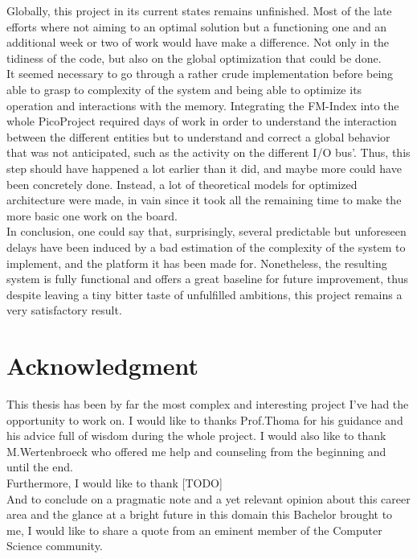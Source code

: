 Globally, this project in its current states remains unfinished. Most of the late efforts where not aiming to an optimal solution but a functioning one and an additional week or two of work would have make a difference. Not only in the tidiness of the code, but also on the global optimization that could be done. \\

It seemed necessary to go through a rather crude implementation before being able to grasp to complexity of the system and being able to optimize its operation and interactions with the memory. Integrating the FM-Index into the whole PicoProject required days of work in order to understand the interaction between the different entities but to understand and correct a global behavior that was not anticipated, such as the activity on the different I/O bus'. Thus, this step should have happened a lot earlier than it did, and maybe more could have been concretely done. Instead, a lot of theoretical models for optimized architecture were made, in vain since it took all the remaining time to make the more basic one work on the board. \\

In conclusion, one could say that, surprisingly, several predictable but unforeseen delays have been induced by a bad estimation of the complexity of the system to implement, and the platform it has been made for. Nonetheless, the resulting system is fully functional and offers a great baseline for future improvement, thus despite leaving a tiny bitter taste of unfulfilled ambitions, this project remains a very satisfactory result.

\section{Acknowledgment}

This thesis has been by far the most complex and interesting project I've had the opportunity to work on. I would like to thanks Prof.Thoma for his guidance and his advice full of wisdom during the whole project. I would also like to thank M.Wertenbroeck who offered me help and counseling from the beginning and until the end. \\

Furthermore, I would like to thank [TODO]\\

And to conclude on a pragmatic note and a yet relevant opinion about this career area and the glance at a bright future in this domain this Bachelor brought to me, I would like to share a quote from an eminent member of the Computer Science community.


